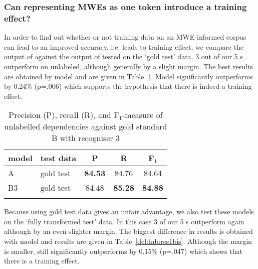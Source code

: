 \documentclass[output=paper]{langsci/langscibook}
\begin{document}
\subsubsection{Can representing MWEs as one token introduce a training effect?}

\indent In order to find out whether or not training data on an MWE-informed corpus can lead to an improved accuracy, i.e. leads to training effect, we compare the output of {\modelB} against the output of {\modelA} tested on the `gold test' data. 3 out of our 5 {\modelB} s outperform {\modelA} on unlabeled, although generally by a slight margin. The best results are obtained by model and are given in Table~\ref{del:tab:res1}. Model significantly outperforms {\modelA} by 0.24\% (p=.006) which supports the hypothesis that there is indeed a training effect.

\begin{table}[h]
    \footnotesize
    \def\arraystretch{1.20} 
    \centering
    \begin{tabular}{l l c c c} %
      \lsptoprule
        \textnormal{model}
        & \textnormal{test data}
        & \textnormal{P}
        & \textnormal{R}
        & \textnormal{F$_1$}
        \\ %
        \midrule
        A & gold test &\textbf{84.53}  &84.76 &84.64 \\
        B3 & gold test &84.48  &\textbf{85.28}  &\textbf{84.88} \tabularnewline %
        \lspbottomrule
    \end{tabular}
    \caption{Precision (P), recall (R), and F$_1$-measure of unlabelled dependencies against gold standard B with recogniser 3 \label{del:tab:res1}}
\end{table}

\indent Because using gold test data gives {\modelB} an unfair advantage, we also test these models on the `fully transformed test' data. In this case 3 of our 5 {\modelB} s outperform {\modelA} again although by an even slighter margin. The biggest difference in results is obtained with model and results are given in Table~\ref{del:tab:res1bis}. Although the margin is smaller, {\modelB} still significantly outperforms {\modelA} by 0.15\% (p=.047) which shows that there is a training effect.
\end{document}
